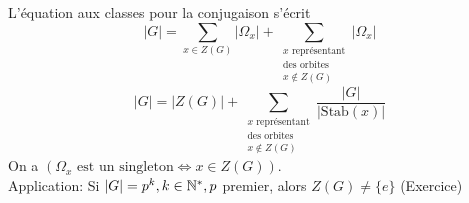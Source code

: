 \documentclass[]{report}
\begin{document}
\begin{prop}{}{}
    L'équation aux classes pour la conjugaison s'écrit
    \[\left|G\right|=\sum_{x\in Z(G)}\left|\Omega_x\right|+\sum_{\substack{x\text{ représentant}\\ \text{des orbites}\\ x\notin Z(G)}} \left|\Omega_x\right|\]
    \[\left|G\right|=\left|Z(G)\right|+\sum_{\substack{x\text{ représentant}\\ \text{des orbites}\\ x\notin Z(G)}} \frac{\left|G\right|}{\left|\text{Stab}(x)\right|}\]
    On a $\left(\Omega_x\text{ est un singleton} \iff x\in Z(G)\right)$.\\
    Application: Si $\left|G\right|=p^k,k\in \mathbb{N}^*,p$ premier, alors $Z(G)\neq \{e\}$ (Exercice)
\end{prop}
\end{document}
